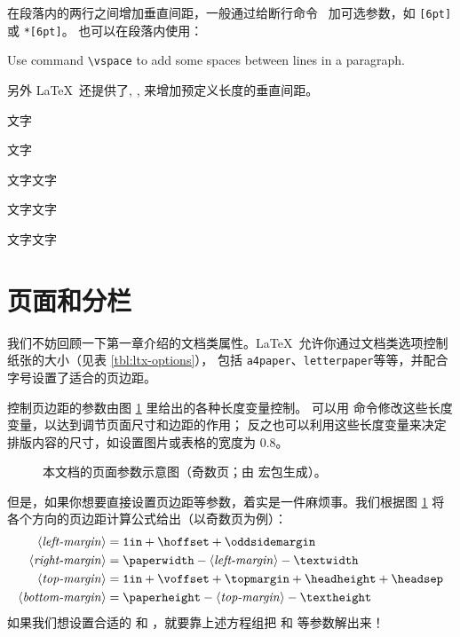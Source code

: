 在段落内的两行之间增加垂直间距，一般通过给断行命令 \crcmd\ 加可选参数，如 \crcmd\texttt{[6pt]} 或 \crcmd\texttt{*[6pt]}。
 也可以在段落内使用：
\begin{example}
Use command \verb|\vspace| to
add \vspace{12pt} some spaces
between lines in a paragraph.
\end{example}

另外 \LaTeX\ 还提供了, ,  来增加预定义长度的垂直间距。
\begin{example}
\parbox[t]{3em}{文字\par 文字}
\parbox[t]{3em}{文字\smallskip 文字}
\parbox[t]{3em}{文字\medskip 文字}
\parbox[t]{3em}{文字\bigskip 文字}
\end{example}

\section{页面和分栏}\label{sec:page-columns}

我们不妨回顾一下第一章介绍的文档类属性。\LaTeX\ 允许你通过文档类选项控制纸张的大小（见表 \ref{tbl:ltx-options}），
包括 \texttt{a4paper}、\texttt{letterpaper}等等，并配合字号设置了适合的页边距。

控制页边距的参数由图 \ref{fig:layouts} 里给出的各种长度变量控制。
可以用  命令修改这些长度变量，以达到调节页面尺寸和边距的作用；
反之也可以利用这些长度变量来决定排版内容的尺寸，如设置图片或表格的宽度为 0.8。

\begin{figure}[!p]
\centering
\layoutpicture*
\caption{本文档的页面参数示意图（奇数页；由  宏包生成）。} \label{fig:layouts}
\end{figure}

但是，如果你想要直接设置页边距等参数，着实是一件麻烦事。我们根据图 \ref{fig:layouts} 将各个方向的页边距计算公式给出（以奇数页为例）：
\begin{align*}
\text{\Arg{left-margin}}   &= \text{\ttfamily 1in} 
                            + \text{\cmd{hoffset}}
                            + \text{\cmd{oddsidemargin}} \\
\text{\Arg{right-margin}}  &= \text{\cmd{paperwidth}} 
                            - \text{\Arg{left-margin}}
                            - \text{\cmd{textwidth}} \\
\text{\Arg{top-margin}}    &= \text{\ttfamily 1in} 
                            + \text{\cmd{voffset}}
                            + \text{\cmd{topmargin}}
                            + \text{\cmd{headheight}}
                            + \text{\cmd{headsep}} \\
\text{\Arg{bottom-margin}} &= \text{\cmd{paperheight}}
                            - \text{\Arg{top-margin}}
                            - \text{\cmd{textheight}}
\end{align*}
如果我们想设置合适的  和 ，就要靠上述方程组把  和  等参数解出来！

